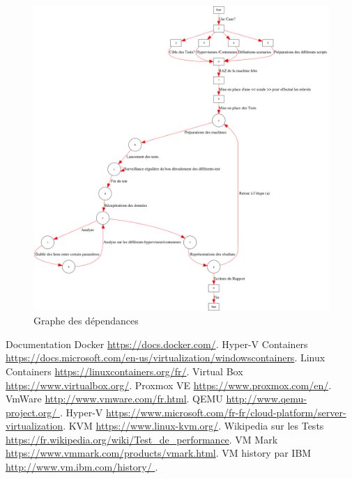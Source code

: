 \documentclass[french]{article}
\begin{document}
\newpage
\begin{figure}[!h]
\centering
\caption{Graphe des dépendances }
\label{Graphe des dépendances }
\includegraphics[scale=0.250]{GrapheDepends.png}
\end{figure}


\newpage
\begin{thebibliography}{9}

          Documentation Docker
          \url{https://docs.docker.com/}.
          Hyper-V Containers
          \url{https://docs.microsoft.com/en-us/virtualization/windowscontainers}.
         Linux Containers
         \url{https://linuxcontainers.org/fr/}.
         Virtual Box
         \url{ https://www.virtualbox.org/}.
         Proxmox VE
         \url{https://www.proxmox.com/en/}.
         VmWare
         \url{ http://www.vmware.com/fr.html}.
         QEMU
         \url{http://www.qemu-project.org/   }.
         Hyper-V
         \url{https://www.microsoft.com/fr-fr/cloud-platform/server-virtualization}.      
         KVM
         \url{https://www.linux-kvm.org/}.
         Wikipedia sur les Tests
         \url{https://fr.wikipedia.org/wiki/Test_de_performance}.
         VM Mark
         \url{https://www.vmmark.com/products/vmark.html}. 
         VM history par IBM
         \url{http://www.vm.ibm.com/history/ }.
               
\end{thebibliography}
\end{document}
